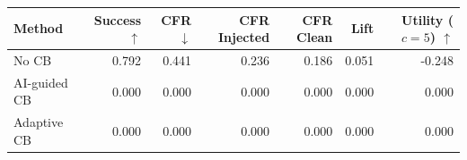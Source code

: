 \begin{tabular}{lrrrrrr}
\toprule
Method & Success $\uparrow$ & CFR $\downarrow$ & CFR Injected & CFR Clean & Lift & Utility ($c=5$) $\uparrow$ \\
\midrule
No CB & 0.792 & 0.441 & 0.236 & 0.186 & 0.051 & -0.248 \\
AI-guided CB & 0.000 & 0.000 & 0.000 & 0.000 & 0.000 & 0.000 \\
Adaptive CB & 0.000 & 0.000 & 0.000 & 0.000 & 0.000 & 0.000 \\
\bottomrule
\end{tabular}
